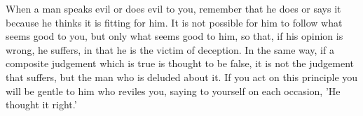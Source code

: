 When a man  speaks evil or does evil  to you, remember that he does  or says it
because he thinks it  is fitting for him. It is not possible  for him to follow
what seems  good to  you, but  only what  seems good  to him,  so that,  if his
opinion is  wrong, he suffers, in  that he is  the victim of deception.  In the
same way, if a composite judgement which is  true is thought to be false, it is
not the judgement that suffers, but the man who is deluded about it. If you act
on this principle you will be gentle to him who reviles you, saying to yourself
on each occasion, 'He thought it right.'
